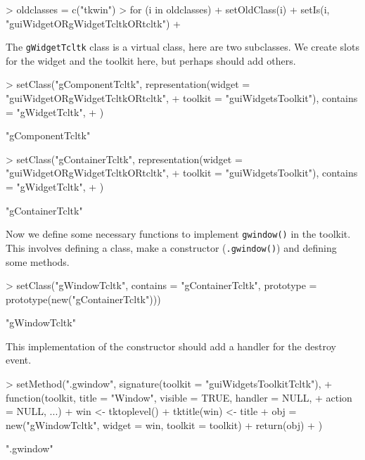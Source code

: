 \documentclass[12pt]{article}
\newcommand{\RCode}[1]{\texttt{#1}}
\newcommand{\RFunc}[1]{\texttt{#1()}}
\begin{document}
\begin{Schunk}
\begin{Sinput}
> oldclasses = c("tkwin")
> for (i in oldclasses) {
+     setOldClass(i)
+     setIs(i, "guiWidgetORgWidgetTcltkORtcltk")
+ }
\end{Sinput}
\end{Schunk}


The \RCode{gWidgetTcltk} class is a virtual class, here are two
subclasses. We create slots for the widget and the toolkit here, but
perhaps should add others.

\begin{Schunk}
\begin{Sinput}
> setClass("gComponentTcltk", representation(widget = "guiWidgetORgWidgetTcltkORtcltk", 
+     toolkit = "guiWidgetsToolkit"), contains = "gWidgetTcltk", 
+     )
\end{Sinput}
\begin{Soutput}
[1] "gComponentTcltk"
\end{Soutput}
\begin{Sinput}
> setClass("gContainerTcltk", representation(widget = "guiWidgetORgWidgetTcltkORtcltk", 
+     toolkit = "guiWidgetsToolkit"), contains = "gWidgetTcltk", 
+     )
\end{Sinput}
\begin{Soutput}
[1] "gContainerTcltk"
\end{Soutput}
\end{Schunk}

Now we define some necessary functions to implement \RFunc{gwindow} in
the toolkit. This involves defining a class, make a constructor
(\RFunc{.gwindow}) and defining some methods.

\begin{Schunk}
\begin{Sinput}
> setClass("gWindowTcltk", contains = "gContainerTcltk", prototype = prototype(new("gContainerTcltk")))
\end{Sinput}
\begin{Soutput}
[1] "gWindowTcltk"
\end{Soutput}
\end{Schunk}

This implementation of the constructor should add a handler for the
destroy event.
\begin{Schunk}
\begin{Sinput}
> setMethod(".gwindow", signature(toolkit = "guiWidgetsToolkitTcltk"), 
+     function(toolkit, title = "Window", visible = TRUE, handler = NULL, 
+         action = NULL, ...) {
+         win <- tktoplevel()
+         tktitle(win) <- title
+         obj = new("gWindowTcltk", widget = win, toolkit = toolkit)
+         return(obj)
+     })
\end{Sinput}
\begin{Soutput}
[1] ".gwindow"
\end{Soutput}
\end{Schunk}
\end{document}
